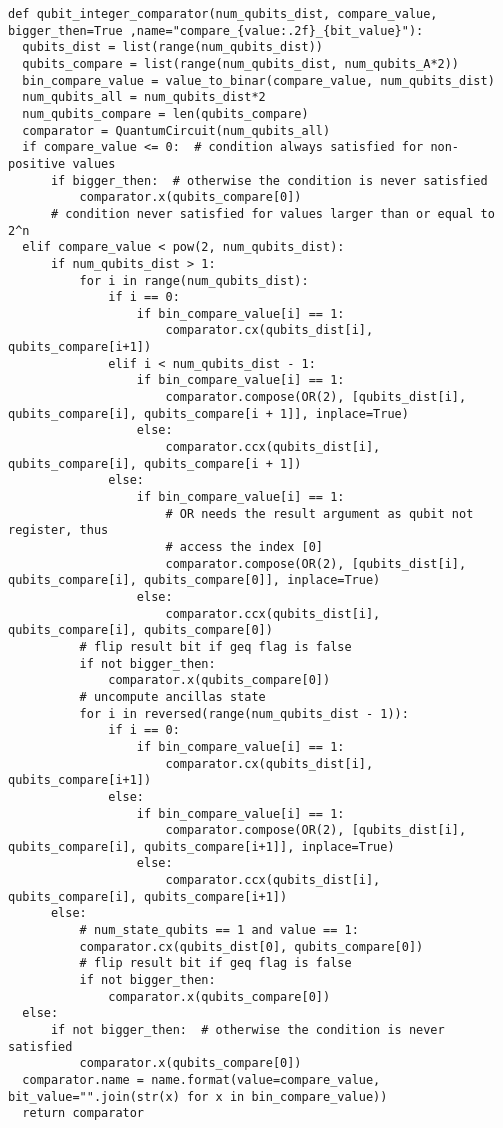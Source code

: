 \documentclass[../../main.tex]{subfiles}
\begin{document}
\begin{lstlisting}[caption={Implementation of quantum comparator as described in section \ref{sec:ImplMaxFunc}},captionpos=b]
  def qubit_integer_comparator(num_qubits_dist, compare_value, bigger_then=True ,name="compare_{value:.2f}_{bit_value}"):
  qubits_dist = list(range(num_qubits_dist))
  qubits_compare = list(range(num_qubits_dist, num_qubits_A*2))
  bin_compare_value = value_to_binar(compare_value, num_qubits_dist)
  num_qubits_all = num_qubits_dist*2
  num_qubits_compare = len(qubits_compare)
  comparator = QuantumCircuit(num_qubits_all)
  if compare_value <= 0:  # condition always satisfied for non-positive values
      if bigger_then:  # otherwise the condition is never satisfied
          comparator.x(qubits_compare[0])
      # condition never satisfied for values larger than or equal to 2^n
  elif compare_value < pow(2, num_qubits_dist):
      if num_qubits_dist > 1:
          for i in range(num_qubits_dist):
              if i == 0:
                  if bin_compare_value[i] == 1:
                      comparator.cx(qubits_dist[i], qubits_compare[i+1])
              elif i < num_qubits_dist - 1:
                  if bin_compare_value[i] == 1:
                      comparator.compose(OR(2), [qubits_dist[i], qubits_compare[i], qubits_compare[i + 1]], inplace=True)
                  else:
                      comparator.ccx(qubits_dist[i], qubits_compare[i], qubits_compare[i + 1])
              else:
                  if bin_compare_value[i] == 1:
                      # OR needs the result argument as qubit not register, thus
                      # access the index [0]
                      comparator.compose(OR(2), [qubits_dist[i], qubits_compare[i], qubits_compare[0]], inplace=True)
                  else:
                      comparator.ccx(qubits_dist[i], qubits_compare[i], qubits_compare[0])
          # flip result bit if geq flag is false
          if not bigger_then:
              comparator.x(qubits_compare[0])
          # uncompute ancillas state
          for i in reversed(range(num_qubits_dist - 1)):
              if i == 0:
                  if bin_compare_value[i] == 1:
                      comparator.cx(qubits_dist[i], qubits_compare[i+1])
              else:
                  if bin_compare_value[i] == 1:
                      comparator.compose(OR(2), [qubits_dist[i], qubits_compare[i], qubits_compare[i+1]], inplace=True)
                  else:
                      comparator.ccx(qubits_dist[i], qubits_compare[i], qubits_compare[i+1])
      else:
          # num_state_qubits == 1 and value == 1:
          comparator.cx(qubits_dist[0], qubits_compare[0])
          # flip result bit if geq flag is false
          if not bigger_then:
              comparator.x(qubits_compare[0])
  else:
      if not bigger_then:  # otherwise the condition is never satisfied
          comparator.x(qubits_compare[0])
  comparator.name = name.format(value=compare_value, bit_value="".join(str(x) for x in bin_compare_value))
  return comparator
\end{lstlisting}
\end{document}
